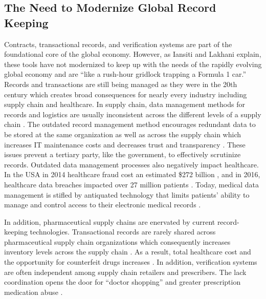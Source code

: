 \documentclass[sigconf]{acmart}
\begin{document}
\subsection{The Need to Modernize Global Record Keeping}
Contracts, transactional records, and verification systems are part of the foundational core of the global economy. However, as Iansiti and Lakhani \cite{hbr} explain, these tools have not modernized to keep up with the needs of the rapidly evolving global economy and are ``like a rush-hour gridlock trapping a Formula 1 car.'' Records and transactions are still being managed as they were in the 20th century which creates broad consequences for nearly every industry including supply chain and healthcare. In supply chain, data management methods for records and logistics are usually inconsistent across the different levels of a supply chain \cite{arbc4}. The outdated record management method encourages redundant data to be stored at the same organization as well as across the supply chain which increases IT maintenance costs and decreases trust and transparency \cite{arbc1}. These issues prevent a tertiary party, like the government, to effectively scrutinize records. Outdated data management processes also negatively impact healthcare. In the USA in 2014 healthcare fraud cost an estimated \$272 billion \cite{economist2014}, and in 2016, healthcare data breaches impacted over 27 million patients \cite{das2017}. Today, medical data management is stifled by antiquated technology that limits patients' ability to manage and control access to their electronic medical records \cite{ekblaw2016medrec}. 

In addition, pharmaceutical supply chains are enervated by current record-keeping technologies. Transactional records are rarely shared across pharmaceutical supply chain organizations which consequently increases inventory levels across the supply chain \cite{Nematollahi01}. As a result, total healthcare cost and the opportunity for counterfeit drugs increases \cite{Sahay01}. In addition, verification systems are often independent among supply chain retailers and prescribers. The lack coordination opens the door for ``doctor shopping'' and greater prescription medication abuse \cite{hitchingHealthcare}. 
\end{document}
